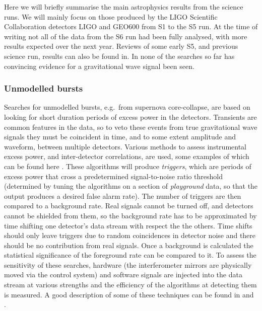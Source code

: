 \documentclass{article}
\begin{document}
Here we will briefly summarise the main astrophysics results from the science
runs. We will mainly focus on those produced by the LIGO Scientific
Collaboration \cite{LSCweb} detectors LIGO and GEO600 from S1 to the S5 run.
At the time of writing not all of the data from the S6 run had been fully
analysed, with more results expected over the next year. Reviews of some early
S5, and previous science run, results can also be found in\cite{Papa:2008,
Fairhurst:2009}. In none of the searches so far has convincing evidence for a
gravitational wave signal been seen.

\subsubsection{Unmodelled bursts}\label{subsubsection:unmodelled}
Searches for unmodelled bursts, e.g.~from supernova core-collapse, are based on
looking for short duration periods of excess power in the detectors. Transients
are common features in the data, so to veto these events from true gravitational
wave signals they must be coincident in time, and to some extent amplitude and
waveform, between multiple detectors. Various methods to assess instrumental
excess power, and inter-detector correlations, are used, some examples of which
can be found here \cite{Klimenko:2004, Anderson:2001, Searle:2008, McNabb:2004,
Cadonati:2004, Chatterji:2004, Chatterji:2006}. These algorithms will produce
{\it triggers}, which are periods of excess power that cross a predetermined
signal-to-noise ratio threshold (determined by tuning the algorithms on a
section of {\it playground} data, so that the output produces a desired false
alarm rate). The number of triggers are then compared to a background rate. Real
signals cannot be turned off, and detectors cannot be shielded from them, so the
background rate has to be approximated by time shifting one detector's data
stream with respect the the others. Time shifts should only leave triggers due
to random coincidences in detector noise and there should be no contribution
from real signals. Once a background is calculated the statistical significance
of the foreground rate can be compared to it. To assess the sensitivity of these
searches, hardware (the interferometer mirrors are physically moved via the
control system) and software signals are injected into the data stream at
various strengths and the efficiency of the algorithms at detecting them is
measured. A good description of some of these techniques can be found in
\cite{Abbott:2004b} and \cite{Abbott:2006a}.
\end{document}
